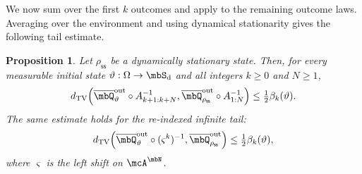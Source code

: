 \documentclass[a4paper]{article}
\numberwithin{equation}{section}   %
\theoremstyle{plain}   %
\theoremstyle{plain}   %
\newtheorem{prop}[lemma]{Proposition}   %
\theoremstyle{examplestyle}
\DeclareMathOperator{\states}{\mbS_d}   %
\newcommand{\s}{\rho_{\mathsf{ss}}}     %
\newcommand{\TV}{d_{\mathrm{TV}}}
\begin{document}
We now sum over the first $k$ outcomes and apply  to the remaining outcome laws.
Averaging over the environment and using dynamical stationarity gives the following tail estimate.

\begin{prop}
\label{univ:prop:tail}
    Let $\s$ be a dynamically stationary state. 
    Then, for every measurable initial state $\vartheta:\Omega\to\states$ and all integers $k\ge0$ and $N\ge1$,
    \begin{equation}
    \label{univ:eq:tailtv}
        \TV\!\left(
            \overline\mbQ^{\mathrm{out}}_\vartheta
                \circ A_{k+1:k+N}^{-1},
            \overline\mbQ^{\mathrm{out}}_{\s}
                \circ A_{1:N}^{-1}
        \right)
        \le \tfrac12\beta_k(\vartheta).
    \end{equation}
    The same estimate holds for the re-indexed infinite tail:
    \begin{equation}
    \label{univ:eq:tailtv_infinite}
        \TV\!\left(
            \overline\mbQ^{\mathrm{out}}_\vartheta
                \circ(\varsigma^k)^{-1},
            \overline\mbQ^{\mathrm{out}}_{\s}
        \right)
        \le \tfrac12\beta_k(\vartheta),
    \end{equation}
    where $\varsigma$ is the left shift on $\mcA^\mbN$.
\end{prop}
%
\end{document}
